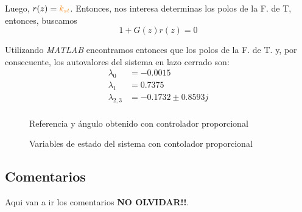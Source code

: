 Luego, $r(z) = \nara{k_{st}}$. Entonces, nos interesa determinas los polos de
la F. de T, entonces, buscamos
\begin{equation}
  1 + G(z)r(z) = 0
\end{equation}

Utilizando \textit{MATLAB} encontramos entonces que los polos de la F. de T. y,
por consecuente, los autovalores del sistema en lazo cerrado son:
\begin{align}
  \lambda_{0} &= -0.0015 \\
  \lambda_{1} &= 0.7375 \\
  \lambda_{2,3} &= -0.1732 \pm 0.8593j \\
\end{align}

\begin{figure}[h]
  \centering
  
  \caption{Referencia y ángulo obtenido con controlador proporcional}\label{fig:psi-prop-disc}
\end{figure}

\begin{figure}[h]
  \centering
  
  \caption{Variables de estado del sistema con contolador proporcional}\label{fig:estado-prop-disc}
\end{figure}


\FloatBarrier


\subsection{Comentarios}

Aqui van a ir los comentarios \textbf{NO OLVIDAR!!}.

